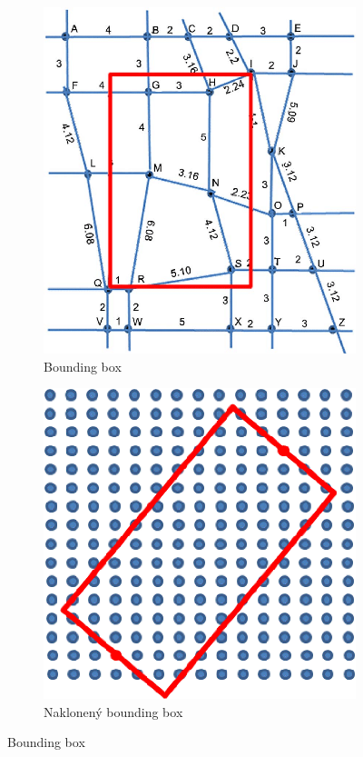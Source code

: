 \begin{figure}[H]
\centering
	\begin{subfigure}[b]{0.45\textwidth}
		\centering
 		\includegraphics[width=0.67\linewidth]{images/bounding-box}
		\caption{Bounding box}
		\label{fig:boundingBoxReal}
	\end{subfigure}
	\begin{subfigure}[b]{0.45\textwidth}
		\centering
		\includegraphics[width=0.67\linewidth]{images/bounding-box-rect}
			\caption{Naklonený bounding box}
		\label{fig:boundingBoxRect}
	\end{subfigure}
	\caption[Bounding box]{Bounding box \cite{bounding-box} \cite{bounding-box-1}}
	\label{fig:boundingBox}
\end{figure}

%
%

